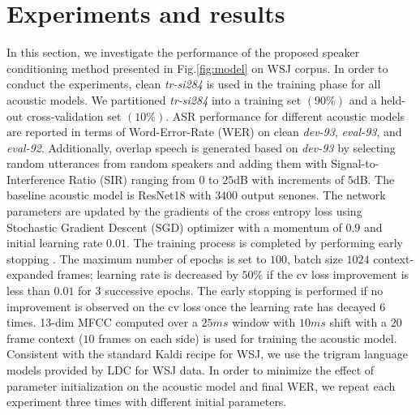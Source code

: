 \documentclass{article}
\begin{document}








\section{Experiments and results}
\label{sec:exp}
In this section, we investigate the performance of the proposed speaker conditioning method presented in Fig.\ref{fig:model} on WSJ corpus. 
In order to conduct the experiments, clean \textit{tr-si284} is used in the training phase for all acoustic models. We partitioned \textit{tr-si284} into a training set $(90\%)$ and a held-out cross-validation set $(10\%)$. ASR performance for different acoustic models are reported in terms of Word-Error-Rate (WER) on clean \textit{dev-93}, \textit{eval-93}, and \textit{eval-92}. Additionally, overlap speech is generated based on \textit{dev-93} by selecting random utterances from random speakers and adding them with Signal-to-Interference Ratio (SIR) ranging from $0$ to $25$dB with increments of $5$dB. The baseline acoustic model is ResNet18 with $3400$ output senones.  The  network parameters  are  updated  by  the  gradients  of the cross entropy loss using Stochastic Gradient Descent (SGD) optimizer with a momentum of $0.9$ and initial learning rate $0.01$. The training process is completed by performing early stopping \cite{zhang2016understanding}. The maximum number of epochs is set to $100$, batch size  $1024$ context-expanded frames; learning rate is decreased by $50\%$ if the cv loss improvement is less than $0.01$ for $3$ successive epochs. The early stopping is performed if no improvement is observed on the cv loss once the learning rate has decayed $6$ times. 13-dim MFCC computed over a $25ms$ window with $10ms$ shift with a $20$ frame context ($10$ frames on each side) is used for training the acoustic model. Consistent with the standard Kaldi recipe for WSJ, we use the trigram language models provided by LDC for WSJ data. In order to minimize the effect of parameter initialization on the acoustic model and final WER, we repeat each experiment three times with different initial parameters.
\end{document}

